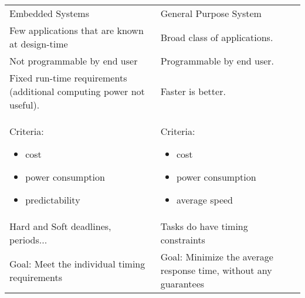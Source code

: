 \begin{tabularx}{\textwidth}{ p{7cm}p{5cm} } %
Embedded Systems & General Purpose System \\ 

\cmidrule{1-2}

Few applications that are \newline
known at design-time & Broad class of applications.  \\
Not programmable by end 
user & Programmable by end user.  \\
Fixed run-time requirements 
(additional computing power 
not useful).  & Faster is better. \\ 
Criteria: 
\begin{itemize}[noitemsep]
\item cost
\item power consumption
\item predictability
\end{itemize}

&
Criteria:
\begin{itemize}[noitemsep]
\item cost
\item power consumption
\item average speed
\end{itemize}

\\

Hard and Soft deadlines, periods... &  Tasks do have timing constraints \\
Goal: Meet the individual timing requirements & Goal: Minimize the average response time, \newline without any guarantees \\

\cmidrule{1-2}



\end{tabularx}


\cleardoublepage